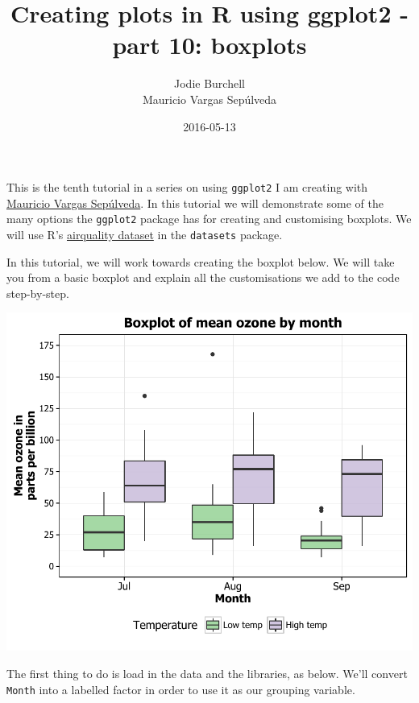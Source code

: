 \documentclass[]{article}
\title{Creating plots in R using ggplot2 - part 10: boxplots}
\author{Jodie Burchell \\ Mauricio Vargas Sepúlveda}
\date{2016-05-13}
\newenvironment{Shaded}{\begin{snugshade}}{\end{snugshade}}
\newcommand{\KeywordTok}[1]{\textcolor[rgb]{0.13,0.29,0.53}{\textbf{{#1}}}}
\newcommand{\DataTypeTok}[1]{\textcolor[rgb]{0.13,0.29,0.53}{{#1}}}
\newcommand{\StringTok}[1]{\textcolor[rgb]{0.31,0.60,0.02}{{#1}}}
\newcommand{\NormalTok}[1]{{#1}}
\begin{document}
\maketitle

{
\setcounter{tocdepth}{2}
\tableofcontents
}
This is the tenth tutorial in a series on using \texttt{ggplot2} I am
creating with \href{http://pachamaltese.github.io/}{Mauricio Vargas
Sepúlveda}. In this tutorial we will demonstrate some of the many
options the \texttt{ggplot2} package has for creating and customising
boxplots. We will use R's
\href{https://stat.ethz.ch/R-manual/R-devel/library/datasets/html/airquality.html}{airquality
dataset} in the \texttt{datasets} package.

In this tutorial, we will work towards creating the boxplot below. We
will take you from a basic boxplot and explain all the customisations we
add to the code step-by-step.

\begin{center}\includegraphics{10_Boxplots_pdf/box_final-1} \end{center}

The first thing to do is load in the data and the libraries, as below.
We'll convert \texttt{Month} into a labelled factor in order to use it
as our grouping variable.

\begin{Shaded}
\end{Shaded}
\end{document}
